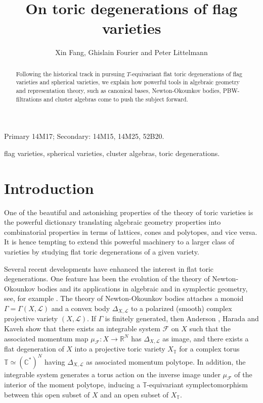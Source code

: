 \documentclass{emsprocart}
\title[On toric degenerations of flag varieties]{On toric degenerations of flag varieties}
\author[Xin Fang, Ghislain Fourier and Peter Littelmann]{Xin Fang, Ghislain Fourier and Peter Littelmann}
\theoremstyle{definition}
\begin{document}
\begin{abstract}
Following the historical track in pursuing $T$-equivariant flat toric degenerations of flag varieties and spherical varieties, we explain how powerful tools in algebraic geometry and representation theory, such as canonical bases, Newton-Okounkov bodies, PBW-filtrations and cluster algebras
come to push the subject forward.
\end{abstract}


\begin{classification}
Primary 14M17; Secondary: 14M15, 14M25, 52B20.
\end{classification}

\begin{keywords}
flag varieties, spherical varieties, cluster algebras, toric degenerations.
\end{keywords}


\maketitle
\setcounter{tocdepth}{1}
\tableofcontents
\section{Introduction}
One of the beautiful and astonishing properties of the theory of toric varieties is the powerful dictionary
translating algebraic geometry properties into combinatorial properties in terms of lattices, cones and polytopes, and vice versa.
It is hence tempting to extend this powerful machinery to a larger class of varieties by studying flat toric degenerations
of a given variety. 

Several recent developments have enhanced the interest in flat toric degenerations. One feature
has been the evolution of the theory of Newton-Okounkov bodies \cite{K1, KK} and  
its applications in algebraic and in symplectic geometry, see, for example \cite{FLP, HP, HK,  K1, K2, KK, KüL,LaMu, NNU2, WN}. The theory of Newton-Okounkov
bodies attaches a monoid $\Gamma=\Gamma(X,\mathcal L)$ and a convex body $\Delta_{X,\mathcal L}$ 
to a polarized (smooth) complex projective variety $(X,\mathcal L)$.
If $\Gamma$ is finitely generated, then Anderson \cite{A}, Harada and Kaveh \cite{HK} show that there exists an integrable system $\mathcal F$ on $X$ 
such that the associated momentum map $\mu_{\mathcal F} : X \rightarrow \mathbb R^N$ has $\Delta_{X,\mathcal L}$ as image, 
and there exists a flat degeneration of $X$ into a projective toric variety $X_{\mathbb T}$ for a complex torus 
$\mathbb T\simeq (\mathbb C^*)^N$ having $\Delta_{X,\mathcal L}$ as associated momentum polytope. In addition,
the integrable system generates a torus action on the inverse image under $\mu_{\mathcal F}$ 
of the interior of the moment polytope, inducing a $\mathbb T$-equivariant symplectomorphism between this open subset  
of $X$ and an open subset of $X_{\mathbb T}$.
\end{document}
